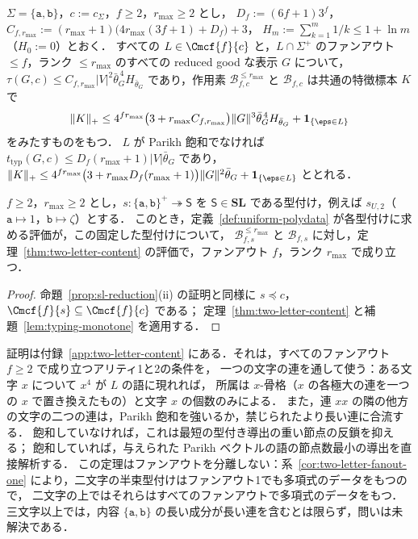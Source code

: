 \begin{theorem}
\label{thm:two-letter-content}
$\Sigma=\{\mathtt a,\mathtt b\}$，$c:=c_\Sigma$，$f\ge2$，$r_{\max}\ge2$ とし，
$D_f:=(6f+1)3^f$，
$C_{f,r_{\max}}:=(r_{\max}+1)\bigl(4r_{\max}(3f+1)+D_f\bigr)+3$，
$H_m:=\sum_{k=1}^m1/k\le1+\ln m$（$H_0:=0$）とおく．
すべての $L\in\Cmcf{f}{c}$ と，$L\cap\Sigma^+$ のファンアウト $\le f$，ランク $\le r_{\max}$ のすべての reduced good な表示 $G$ について，
$\tau(G,c)\le C_{f,r_{\max}}|V|^2\bar\theta_G^{\,4}H_{\bar\theta_G}$ であり，作用素
$\mathcal B^{\le r_{\max}}_{f,c}$ と $\mathcal B_{f,c}$ は共通の特徴標本 $K$ で
\[
 \|K\|_+\le4^{fr_{\max}}\bigl(3+r_{\max}C_{f,r_{\max}}\bigr)\|G\|^3\bar\theta_G^{\,4}H_{\bar\theta_G}
 +\mathbf 1_{\{\eps\in L\}}
\]
をみたすものをもつ．
$L$ が Parikh 飽和でなければ $t_{\mathrm{typ}}(G,c)\le D_f(r_{\max}+1)|V|\bar\theta_G$ であり，
$\|K\|_+\le4^{fr_{\max}}\bigl(3+r_{\max}D_f(r_{\max}+1)\bigr)\|G\|^2\bar\theta_G
+\mathbf 1_{\{\eps\in L\}}$ ととれる．
\end{theorem}

\begin{corollary}[二文字の上の半束型付け]
\label{cor:two-letter-semilattice}
$f\ge2$，$r_{\max}\ge2$ とし，$s:\{\mathtt a,\mathtt b\}^+\twoheadrightarrow\mathsf S$ を
$\mathsf S\in\mathbf{SL}$ である型付け，例えば $s_{U,2}$（$\mathtt a\mapsto1$，$\mathtt b\mapsto\zeta$）とする．
このとき，定義~\ref{def:uniform-polydata} が各型付けに求める評価が，この固定した型付けについて，
$\mathcal B^{\le r_{\max}}_{f,s}$ と $\mathcal B_{f,s}$ に対し，定理~\ref{thm:two-letter-content} の評価で，ファンアウト $f$，ランク $r_{\max}$ で成り立つ．
\end{corollary}

\begin{proof}
命題~\ref{prop:sl-reduction}(ii) の証明と同様に $s\preceq c$，$\Cmcf{f}{s}\subseteq\Cmcf{f}{c}$ である；
定理~\ref{thm:two-letter-content} と補題~\ref{lem:typing-monotone} を適用する．
\end{proof}

証明は付録~\ref{app:two-letter-content} にある．それは，すべてのファンアウト $f\ge2$ で成り立つアリティ1と2の条件を，
一つの文字の連を通して使う：ある文字 $x$ について $x^4$ が $L$ の語に現れれば，
所属は $x$-骨格（$x$ の各極大の連を一つの $x$ で置き換えたもの）と文字 $x$ の個数のみによる．
また，連 $xx$ の隣の他方の文字の二つの連は，Parikh 飽和を強いるか，禁じられたより長い連に合流する．
飽和していなければ，これは最短の型付き導出の重い節点の反鎖を抑える；
飽和していれば，与えられた Parikh ベクトルの語の節点数最小の導出を直接解析する．
この定理はファンアウトを分離しない：系~\ref{cor:two-letter-fanout-one} により，二文字の半束型付けはファンアウト1でも多項式のデータをもつので，
二文字の上ではそれらはすべてのファンアウトで多項式のデータをもつ．
三文字以上では，内容 $\{\mathtt a,\mathtt b\}$ の長い成分が長い連を含むとは限らず，問いは未解決である．

